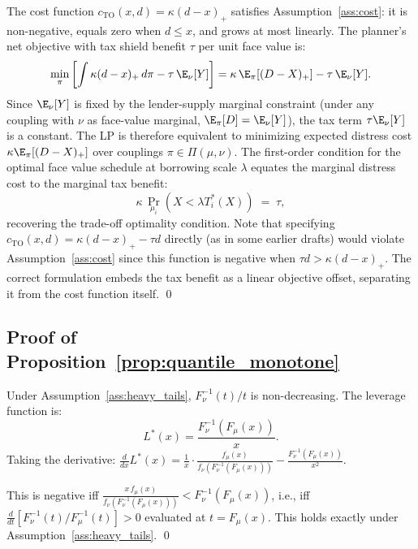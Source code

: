 The cost function $c_{\mathrm{TO}}(x,d) = \kappa(d-x)_+$ satisfies Assumption~\ref{ass:cost}: it is non-negative, equals zero when $d \leq x$, and grows at most linearly. The planner's net objective with tax shield benefit $\tau$ per unit face value is:
\[
  \min_\pi \left[\int \kappa(d-x)_+\,d\pi - \tau\,\E_\nu[Y]\right] = \kappa\,\E_\pi[(D-X)_+] - \tau\,\E_\nu[Y].
\]
Since $\E_\nu[Y]$ is fixed by the lender-supply marginal constraint (under any coupling with $\nu$ as face-value marginal, $\E_\pi[D] = \E_\nu[Y]$), the tax term $\tau\E_\nu[Y]$ is a constant. The LP is therefore equivalent to minimizing expected distress cost $\kappa\E_\pi[(D-X)_+]$ over couplings $\pi \in \Pi(\mu,\nu)$. The first-order condition for the optimal face value schedule at borrowing scale $\lambda$ equates the marginal distress cost to the marginal tax benefit:
\[
  \kappa\,\Pr_{\mu_i}(X < \lambda T_i^*(X)) \;=\; \tau,
\]
recovering the trade-off optimality condition. Note that specifying $c_{\mathrm{TO}}(x,d) = \kappa(d-x)_+ - \tau d$ directly (as in some earlier drafts) would violate Assumption~\ref{ass:cost} since this function is negative when $\tau d > \kappa(d-x)_+$. The correct formulation embeds the tax benefit as a linear objective offset, separating it from the cost function itself. \qed

\subsection*{Proof of Proposition~\ref{prop:quantile_monotone}}

Under Assumption~\ref{ass:heavy_tails}, $F_\nu^{-1}(t)/t$ is non-decreasing. The leverage function is:
\[
  L^*(x) = \frac{F_\nu^{-1}(F_\mu(x))}{x}.
\]
Taking the derivative: $\frac{d}{dx}L^*(x) = \frac{1}{x}\cdot\frac{f_\mu(x)}{f_\nu(F_\nu^{-1}(F_\mu(x)))} - \frac{F_\nu^{-1}(F_\mu(x))}{x^2}$.

This is negative iff $\frac{x\,f_\mu(x)}{f_\nu(F_\nu^{-1}(F_\mu(x)))} < F_\nu^{-1}(F_\mu(x))$, i.e., iff $\frac{d}{dt}[F_\nu^{-1}(t)/F_\mu^{-1}(t)] > 0$ evaluated at $t = F_\mu(x)$. This holds exactly under Assumption~\ref{ass:heavy_tails}. \qed
